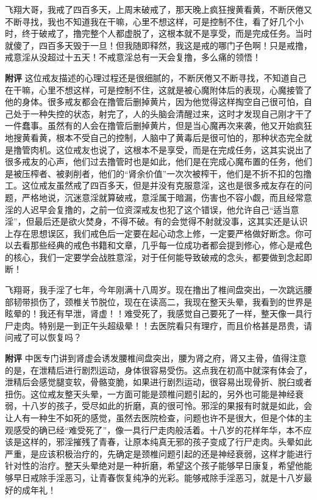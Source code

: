 \begin{case}
    飞翔大哥，我戒了四百多天，上周末破戒了，那天晚上疯狂搜黄看黄，不断厌倦又不断寻找，我也不知道我在干嘛，心里不想这样，可是控制不住，看了好几个小时，终于破戒了，撸完整个人都虚脱了，这根本就不是享受，而是完成任务。当时就傻了，四百多天毁于一旦！但我随即释然，我这是戒的哪门子色啊！只是戒撸，戒意淫从没超过十五天！不戒意淫总有一天会复撸，多么痛的领悟！

    \textbf{附评} 这位戒友描述的心理过程还是很细腻的，不断厌倦又不断寻找，不知道自己在干嘛，心里不想这样，可是控制不住，这就是被心魔附体后的表现，心魔接管了他的身体。很多戒友都会在撸管后删掉黄片，因为他觉得这样掏空自己很可怕，自己处于一种失控的状态，射完了，人的头脑会清醒过来，这时才发现自己刚才干了一件蠢事。虽然有的人会在撸管后删掉黄片，但是当心魔再次来袭，他又开始疯狂地搜黄看黄，根本不受自己的控制，人脑中了黄毒后是很可怕的，那种状态完全就是撸管肉机。这位戒友也说了，这根本不是享受，而是在完成任务，这其实说出了很多戒友的心声，他们过去撸管时也是如此，他们是在完成心魔布置的任务，他们是被压榨者、被剥削者，他们的“肾余价值”一次次被榨干，他们是不折不扣的包撸工。这位戒友虽然戒了四百多天，但是并没有克服意淫，这也是很多戒友存在的问题，严格地说，沉迷意淫就算破戒，意淫属于暗漏，伤害也不容小觑，而且经常意淫的人迟早会复撸的，之前一位资深戒友也犯了这个错误，他允许自己“适当意淫”，但最后还是欲火焚身，不得不破。有的会觉得不射就没事，这其实还是认识上存在思想误区，我们戒色后一定要在起心动念上修，一定要严格做好断念。你可以去看那些经典的戒色书籍和文章，几乎每一位成功者都会提到修心，修心是戒色的核心，我们一定要学会战胜意淫，对于任何能导致破戒的念头，都要做到念起即断！
\end{case}

\begin{case}
    飞翔哥，我手淫了七年，今年刚满十八周岁。现在撸出了椎间盘突出，一次跳远腰部韧带损伤了，颈椎关节脱位，现在在读高二，我现在整天头晕，我看到的世界是眩晕的！我还有早泄，肾虚！！难受死了，我感觉自己要死了一样，整天像一具行尸走肉。特别是一到正午头超级晕！！去医院看只有理疗，而且价格甚是昂贵，请问戒了可以恢复吗？

    \textbf{附评} 中医专门讲到肾虚会诱发腰椎间盘突出，腰为肾之府，肾又主骨，值得注意的是，在泄精后进行剧烈运动，身体很容易受伤。这点我在初高中就深有体会了，泄精后会感觉腿变软，骨骼变脆，如果进行剧烈运动，很容易出现骨折、脱臼或者扭伤。这位戒友整天头晕，一方面可能是颈椎问题引起的，另外也可能是神经衰弱，十八岁的孩子，受尽如此的折磨，真的很可怜。邪淫的果报有时就是如此，会让人有一种生不如死的感觉，虽然去医院检查，问题也许不是很大，但是个体的主观感受的确已经“难受死了”，像一具行尸走肉般活着。十八岁的花样年华，本不应该是这样的，邪淫摧残了青春，让原本纯真无邪的孩子变成了行尸走肉。头晕如此严重，是应该积极治疗的，先确定是颈椎问题引起的还是神经衰弱，这样才能进行针对性的治疗。整天头晕绝对是一种折磨，希望这个孩子能够早日康复，希望他能够早日戒除手淫恶习，让青春恢复纯净的光彩。能够戒除手淫恶习，就是十八岁最好的成年礼！
\end{case}

